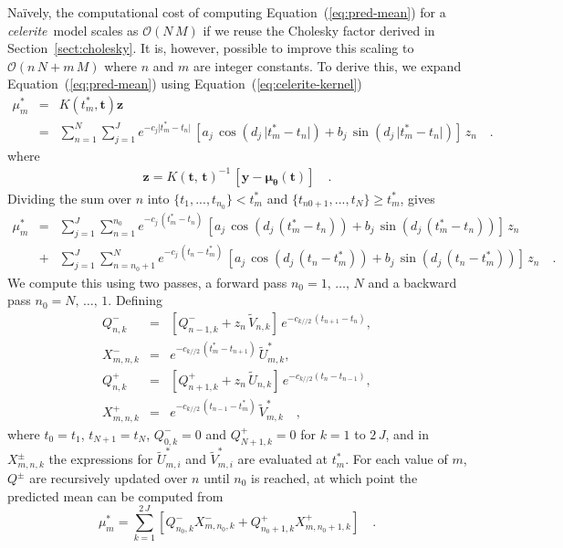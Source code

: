 \documentclass[manuscript, letterpaper]{aastex6}
\newcommand{\celeriteterm}{\emph{celerite}}
\renewcommand{\eqref}[1]{\ref{eq:#1}}
\newcommand{\Eq}[1]{Equation~(\eqref{#1})}
\newcommand{\eq}[1]{\Eq{#1}}
\newcommand{\sectionname}{Section}
\newcommand{\sectref}[1]{\ref{sect:#1}}
\newcommand{\Sect}[1]{\sectionname~\sectref{#1}}
\newcommand{\sect}[1]{\Sect{#1}}
\newcommand{\bvec}[1]{{\ensuremath{\boldsymbol{#1}}}}
\begin{document}
{Na\"ively, the computational cost of computing \eq{pred-mean} for a
\celeriteterm\ model scales as $\mathcal{O}(N\,M)$ if we reuse the Cholesky
factor derived in \sect{cholesky}.
It is, however, possible to improve this scaling to $\mathcal{O}(n\,N +
    m\,M)$ where $n$ and $m$ are integer constants.
To derive this, we expand \eq{pred-mean} using \eq{celerite-kernel}
\begin{eqnarray}
    \mu^*_m &=& K(t^*_m,\bvec{t}) \bvec{z} \\
    &=& \sum_{n=1}^N \sum_{j=1}^J e^{-c_j \vert t^*_m-t_n\vert}\,\left[
        a_j\,\cos{(d_j\,\vert t^*_m-t_n\vert)} +
        b_j\,\sin{(d_j\,\vert t^*_m-t_n\vert)}
        \right] \,z_{n} \quad. \nonumber
\end{eqnarray}
where
\begin{eqnarray}
    \bvec{z} = {K(\bvec{t},\,\bvec{t})}^{-1}\,\left[\bvec{y} -
        \bvec{\mu}_\bvec{\theta}(\bvec{t})\right] \quad.
\end{eqnarray}
Dividing the sum over $n$ into $\{t_1,...,t_{n_0}\} < t^*_m$ and
$\{t_{n0+1},...,t_N\} \ge t^*_m$, gives
\begin{eqnarray}
    \mu^*_m &=& \sum_{j=1}^J\sum_{n=1}^{n_0}
    e^{-c_j\,(t^*_m-t_n)}\,\left[a_j\,\cos{(d_j\,(t^*_m-t_n))}
        +b_j\,\sin{(d_j\,(t^*_m-t_n))}\right]\,z_n \\
    &+& \sum_{j=1}^J\sum_{n=n_0+1}^N  e^{-c_j\,(t_n-t^*_m)}\,\left[
        a_j\,\cos{(d_j\,(t_n-t^*_m))}+b_j\,\sin{(d_j\,(t_n-t^*_m))}\right]\,z_n
    \quad. \nonumber
\end{eqnarray}
We compute this using two passes, a forward pass $n_0 = 1,\,\ldots,\,N$ and
a backward pass $n_0 = N,\,\ldots,\,1$.
Defining
\begin{eqnarray}
    Q^-_{n,k} &=& \left[Q^-_{n-1,k}+z_n\,\tilde V_{n,k}\right]\,e^{-c_{k//2}\,(t_{n+1}-t_{n})},\\
    X^-_{m,n,k} &=& e^{-c_{k//2}\,(t_m^*-t_{n+1})}\,\tilde U_{m,k}^*,\\
    Q^+_{n,k} &=& \left[Q^+_{n+1,k}+z_n\,\tilde U_{n,k}\right]\,e^{-c_{k//2}(t_{n}-t_{n-1})},\\
    X^+_{m,n,k} &=& e^{-c_{k//2}\,(t_{n-1}-t_m^*)}\,\tilde V_{m,k}^* \quad,
\end{eqnarray}
where $t_0=t_1$, $t_{N+1}=t_N$, $Q^-_{0,k} = 0$ and $Q^+_{N+1,k}=0$ for $k=1$
to $2\,J$, and in $X^\pm_{m,n,k}$ the expressions
for $\tilde U_{m,i}^*$ and $\tilde V_{m,i}^*$ are evaluated at $t_m^*$.
For each value of $m$, $Q^\pm$ are recursively updated over $n$ until $n_0$ is
reached, at which point the predicted mean can be computed from
\begin{equation}
    \mu^*_m = \sum_{k=1}^{2\,J}
    \left[Q^-_{n_0,k}X^-_{m,n_0,k}+Q^+_{n_0+1,k}X^+_{m,n_0+1,k}\right] \quad.
\end{equation}
}


\end{document}
